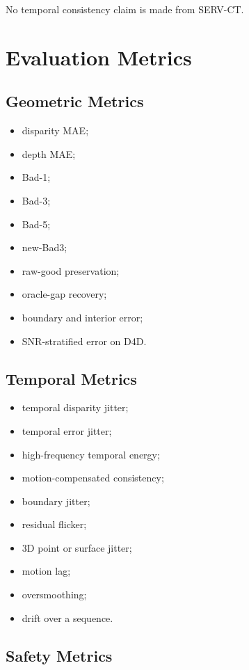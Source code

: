 \documentclass[11pt,a4paper]{article}
\begin{document}
No temporal consistency claim is made from SERV-CT.

\section{Evaluation Metrics}

\subsection{Geometric Metrics}

\begin{itemize}[leftmargin=*]
    \item disparity MAE;
    \item depth MAE;
    \item Bad-1;
    \item Bad-3;
    \item Bad-5;
    \item new-Bad3;
    \item raw-good preservation;
    \item oracle-gap recovery;
    \item boundary and interior error;
    \item SNR-stratified error on D4D.
\end{itemize}

\subsection{Temporal Metrics}

\begin{itemize}[leftmargin=*]
    \item temporal disparity jitter;
    \item temporal error jitter;
    \item high-frequency temporal energy;
    \item motion-compensated consistency;
    \item boundary jitter;
    \item residual flicker;
    \item 3D point or surface jitter;
    \item motion lag;
    \item oversmoothing;
    \item drift over a sequence.
\end{itemize}

\subsection{Safety Metrics}
\end{document}
